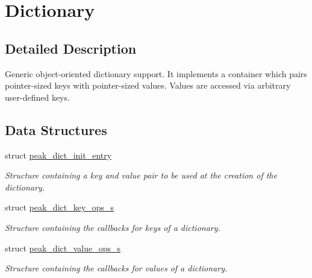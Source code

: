 \hypertarget{group__dict}{
\section{Dictionary}
\label{group__dict}
}


\subsection{Detailed Description}
\begin{Desc}
\item[]Generic object-oriented dictionary support. It implements a container which pairs pointer-sized keys with pointer-sized values. Values are accessed via arbitrary user-defined keys. \end{Desc}


\subsection*{Data Structures}
\begin{CompactItemize}
\item 
struct \hyperlink{structpeak__dict__init__entry}{peak\_\-dict\_\-init\_\-entry}
\begin{CompactList}\small\item\em Structure containing a key and value pair to be used at the creation of the dictionary. \item\end{CompactList}\item 
struct \hyperlink{structpeak__dict__key__ops__s}{peak\_\-dict\_\-key\_\-ops\_\-s}
\begin{CompactList}\small\item\em Structure containing the callbacks for keys of a dictionary. \item\end{CompactList}\item 
struct \hyperlink{structpeak__dict__value__ops__s}{peak\_\-dict\_\-value\_\-ops\_\-s}
\begin{CompactList}\small\item\em Structure containing the callbacks for values of a dictionary. \item\end{CompactList}\end{CompactItemize}
